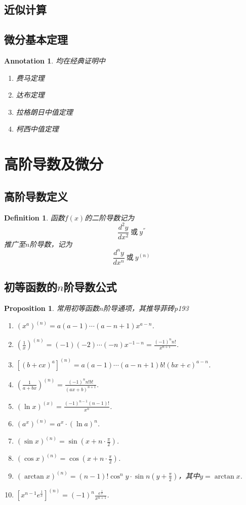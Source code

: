 \documentclass{article}
\newtheorem{proposition}[theorem]{Proposition}
\newtheorem{definition}[theorem]{Definition}
\newtheorem{annotation}[theorem]{Annotation}
\begin{document}
\subsection{近似计算}


\subsection{微分基本定理}

\begin{annotation}
\rm 均在经典证明中
\begin{enumerate}
	\item 费马定理
	\item 达布定理
	\item 拉格朗日中值定理
	\item 柯西中值定理
\end{enumerate}
\end{annotation}

\newpage
\section{高阶导数及微分}

\subsection{高阶导数定义}
\begin{definition}
\rm 函数$f(x)$的{\color{red}二阶导数}记为
$$
\frac{d^2y}{dx^2}~\text{或}~ y^{''}
$$
推广至$n$阶导数，记为
$$
\frac{d^ny}{dx^n}~\text{或}~ y^{(n)}
$$
\end{definition}

\newpage
\subsection{初等函数的$n$阶导数公式}

\begin{proposition} \rm 常用初等函数$n$阶导通项，{\color{blue}其推导菲砖p193}
\begin{enumerate} 
	\item $(x^a)^{(n)} = a(a-1)\cdots(a-n+1)x^{a-n}$.
	\item $\left(\frac{1}{x}\right)^{(n)} = (-1)(-2)\cdots(-n)x^{-1-n} = \frac{(-1)^n n!}{x^{n+1}}$.
	\item $\left[(b+cx)^a\right]^{(n)} = a(a-1)\cdots(a-n+1)b!(bx+c)^{a-n}$.
	\item $\left(\frac{1}{a+bx}\right)^{(n)} = \frac{(-1)^n n!b!}{(ax+b)^{n+1}}$.
	\item $(\ln x)^{(x)} = \frac{(-1)^{n-1}(n-1)!}{x^n}$.
	\item $(a^x)^{(n)} = a^x\cdot (\ln a)^n$.
	\item $(\sin x)^{(n)} = \sin (x+n\cdot\frac{\pi}{2})$.
	\item $(\cos x)^{(n)} = \cos (x+n\cdot\frac{\pi}{2})$.
	\item $(\arctan x)^{(n)} = (n-1)!\cos^n y\cdot\sin n(y+\frac{\pi}{2})$，其中$y = \arctan x$.
	\item $\left[ x^{n-1}e^\frac{1}{x}\right]^{(n)} = (-1)^n \frac{e^\frac{1}{x}}{x^{n+1}}$.
\end{enumerate}
\end{proposition}
\end{document}
